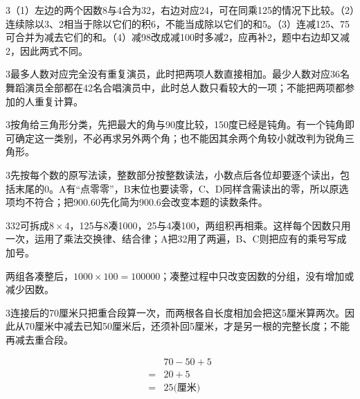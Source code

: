 \documentclass[multi=snippet,border={5bp 20bp 5bp 5bp}]{standalone}
\newenvironment{snippet}[3]{\begin{minipage}{#1bp}\color{answerred}\fontsize{#2}{#3}\selectfont\raggedright}{\end{minipage}}
\begin{document}
\begin{snippet}{505}{11.5}{14}\begin{multicols}{3}\raggedcolumns （1）左边的两个因数8与4合为32，右边对应24，可在同乘125的情况下比较。（2）连续除以3、2相当于除以它们的积6，不能当成除以它们的和5。（3）连减125、75可合并为减去它们的和。（4）减98改成减100时多减2，应再补2，题中右边却又减2，因此两式不同。\end{multicols}\end{snippet}
\begin{snippet}{505}{11.5}{14}\begin{multicols}{3}\raggedcolumns 最多人数对应完全没有重复演员，此时把两项人数直接相加。最少人数对应36名舞蹈演员全部都在42名合唱演员中，此时总人数只看较大的一项；不能把两项都参加的人重复计算。\end{multicols}\end{snippet}
\begin{snippet}{505}{11.5}{14}\begin{multicols}{3}\raggedcolumns 按角给三角形分类，先把最大的角与90度比较，150度已经是钝角。有一个钝角即可确定这一类别，不必再求另外两个角；也不能因其余两个角较小就改判为锐角三角形。\end{multicols}\end{snippet}
\begin{snippet}{505}{11.5}{14}\begin{multicols}{3}\raggedcolumns 先按每个数的原写法读，整数部分按整数读法，小数点后各位却要逐个读出，包括末尾的0。A有“点零零”，B末位也要读零，C、D同样含需读出的零，所以原选项均不符合；把900.60先化简为900.6会改变本题的读数条件。\end{multicols}\end{snippet}
\begin{snippet}{505}{11.5}{14}\begin{multicols}{3}\raggedcolumns 32可拆成\(8\times4\)\allowbreak ，125与8凑1000，25与4凑100，两组积再相乘。这样每个因数只用一次，运用了乘法交换律、结合律；A把32用了两遍，B、C则把应有的乘号写成加号。\par 两组各凑整后，\(1000\times100=100000\)\allowbreak ；凑整过程中只改变因数的分组，没有增加或减少因数。\end{multicols}\end{snippet}
\begin{snippet}{505}{11.5}{14}\begin{multicols}{3}\raggedcolumns 连接后的70厘米只把重合段算一次，而两根各自长度相加会把这5厘米算两次。因此从70厘米中减去已知50厘米后，还须补回5厘米，才是另一根的完整长度；不能再减去重合段。\par \[\begin{aligned}&70-50+5\\={}&20+5\\={}&25\text{(厘米)}\end{aligned}\]\end{multicols}\end{snippet}
\end{document}
